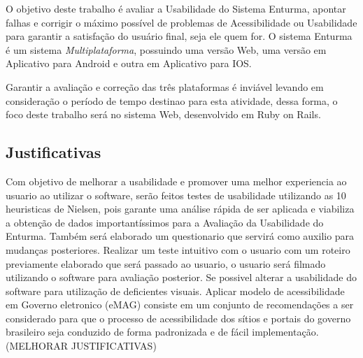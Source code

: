 	O objetivo deste trabalho é avaliar a Usabilidade do Sistema Enturma, apontar falhas e corrigir o máximo possível de problemas de Acessibilidade ou Usabilidade para garantir a satisfação do usuário final, seja ele quem for. O sistema Enturma é um sistema \textit{Multiplataforma}, possuindo uma versão Web, uma versão em Aplicativo para Android e outra em Aplicativo para IOS.

	Garantir a avaliação e correção das três plataformas é inviável levando em consideração o período de tempo destinao para esta atividade, dessa forma, o foco deste trabalho será no sistema Web, desenvolvido em Ruby on Rails.

\subsection{Justificativas}

	
	Com objetivo de melhorar a usabilidade e promover uma melhor experiencia ao usuario ao utilizar o software, serão feitos testes de usabilidade utilizando as 10 heuristicas de Nielsen, pois garante uma análise rápida de ser aplicada e viabiliza a obtenção de dados importantíssimos para a Avaliação da Usabilidade do Enturma.
	Também será elaborado um questionario que servirá como auxilio para mudanças posteriores.
	Realizar um teste intuitivo com o usuario com um roteiro previamente elaborado que será passado ao usuario,
	o usuario será filmado utilizando o software para avaliação posterior.
	Se possivel alterar a usabilidade do software para utilização de deficientes visuais.
	Aplicar modelo de acessibilidade em Governo eletronico (eMAG) consiste em um conjunto de recomendações a ser considerado para que o processo de acessibilidade dos sítios e portais do governo brasileiro seja conduzido de forma padronizada e de fácil implementação.
	(MELHORAR JUSTIFICATIVAS)



